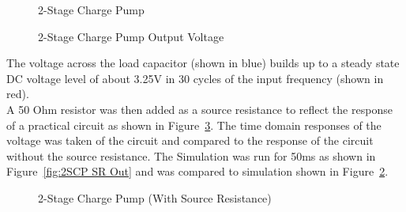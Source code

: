 \documentclass[12pt]{article}
\begin{document}
\begin{figure}[H]
\caption{2-Stage Charge Pump}
\label{fig:2SCP NSR}
\end{figure}

\begin{figure}[H]
\caption{2-Stage Charge Pump Output Voltage}
\label{fig:2SCP NSR Out}
\end{figure}

\noindent The voltage across the load capacitor (shown in blue) builds up to a steady state DC voltage level of about 3.25V in 30 cycles of the input frequency (shown in red). \\

\noindent A 50 Ohm resistor was then added as a source resistance to reflect the response of a practical circuit as shown in Figure~\ref{fig:2SCP SR}. The time domain responses of the voltage was taken of the circuit and compared to the response of the circuit without the source resistance. The Simulation was run for 50ms as shown in Figure~\ref{fig:2SCP SR Out} and was compared to simulation shown in Figure~\ref{fig:2SCP NSR Out}.

\begin{figure}[H]
\caption{2-Stage Charge Pump (With Source Resistance)}
\label{fig:2SCP SR}
\end{figure}
\end{document}
